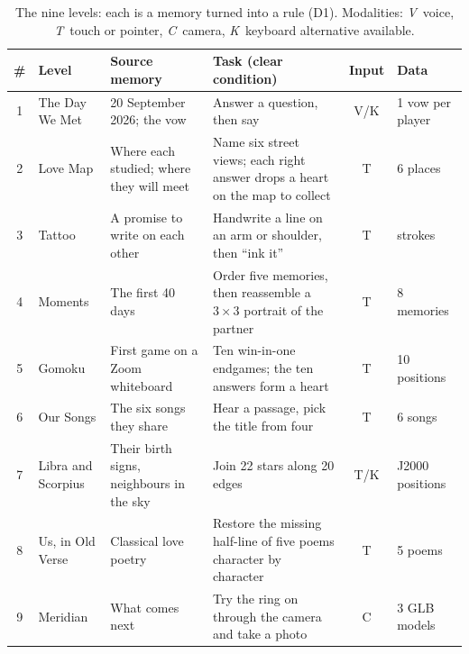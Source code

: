 \documentclass[sigconf,nonacm]{acmart}
\newcommand{\zh}[1]{\begin{CJK*}{UTF8}{gbsn}#1\end{CJK*}}
\newcommand{\dc}[1]{\textsc{D#1}}
\begin{document}
\begin{table}[t]
  \caption{The nine levels: each is a memory turned into a rule (\dc{1}). Modalities: \emph{V}~voice,
  \emph{T}~touch or pointer, \emph{C}~camera, \emph{K}~keyboard alternative available.}
  \label{tab:levels}
  \small
  \begin{tabular}{@{}clp{}p{}cl@{}}
    \toprule
    \# & Level & Source memory & Task (clear condition) & Input & Data \\
    \midrule
    1 & The Day We Met & 20 September 2026; the vow & Answer a question, then say \emph{\zh{我爱你，<name>，我愿意}} aloud; homophones of the name accepted & V/K & 1 vow per player \\
    2 & Love Map & Where each studied; where they will meet & Name six street views; each right answer drops a heart on the map to collect & T & 6 places \\
    3 & Tattoo & A promise to write on each other & Handwrite a line on an arm or shoulder, then ``ink it'' & T & strokes \\
    4 & Moments & The first 40 days & Order five memories, then reassemble a $3\times3$ portrait of the partner & T & 8 memories \\
    5 & Gomoku & First game on a Zoom whiteboard & Ten win-in-one endgames; the ten answers form a heart & T & 10 positions \\
    6 & Our Songs & The six songs they share & Hear a passage, pick the title from four & T & 6 songs \\
    7 & Libra and Scorpius & Their birth signs, neighbours in the sky & Join 22 stars along 20 edges & T/K & J2000 positions \\
    8 & Us, in Old Verse & Classical love poetry & Restore the missing half-line of five poems character by character & T & 5 poems \\
    9 & Meridian & What comes next & Try the ring on through the camera and take a photo & C & 3 GLB models \\
    \bottomrule
  \end{tabular}
\end{table}
\end{document}
